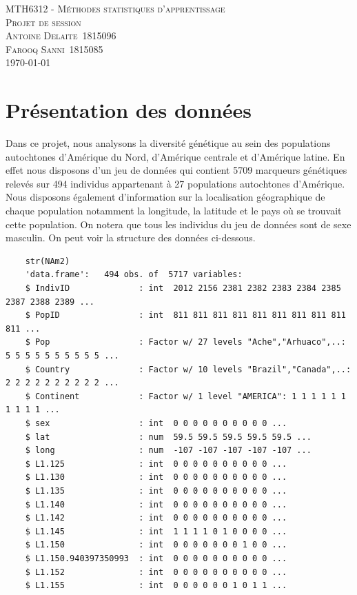 \documentclass[12pt,a4paper]{article}
\begin{document}
\begin{titlepage}
\begin{center}
\textsc{\large MTH6312 - M\'ethodes statistiques d'apprentissage}\\[0.5cm]
\vspace{2in}
\textsc{\LARGE Projet de session}\\[1.5cm]
\vspace{2in}
\textsc{\Large Antoine Delaite~1815096\\Farooq Sanni~1815085}\\[0.5cm]
\today %
\end{center}
\end{titlepage}
\section{Présentation des données}
\noindent Dans ce projet, nous analysons la diversité génétique au sein des
populations autochtones d'Amérique du Nord, d'Amérique centrale et d'Amérique
latine. En effet nous disposons d'un jeu de données qui contient 5709 marqueurs
génétiques relevés sur 494 individus appartenant à 27 populations autochtones
d'Amérique. Nous disposons également d'information sur la localisation
géographique de chaque population notamment la longitude, la latitude et le
pays où se trouvait cette population. On notera que tous les individus du jeu
de données sont de sexe masculin. On peut voir la structure des données
ci-dessous.\vspace{2mm}

\begin{lstlisting}
	str(NAm2)
	'data.frame':	494 obs. of  5717 variables:
	$ IndivID              : int  2012 2156 2381 2382 2383 2384 2385 2387 2388 2389 ...
	$ PopID                : int  811 811 811 811 811 811 811 811 811 811 ...
	$ Pop                  : Factor w/ 27 levels "Ache","Arhuaco",..: 5 5 5 5 5 5 5 5 5 5 ...
	$ Country              : Factor w/ 10 levels "Brazil","Canada",..: 2 2 2 2 2 2 2 2 2 2 ...
	$ Continent            : Factor w/ 1 level "AMERICA": 1 1 1 1 1 1 1 1 1 1 ...
	$ sex                  : int  0 0 0 0 0 0 0 0 0 0 ...
	$ lat                  : num  59.5 59.5 59.5 59.5 59.5 ...
	$ long                 : num  -107 -107 -107 -107 -107 ...
	$ L1.125               : int  0 0 0 0 0 0 0 0 0 0 ...
	$ L1.130               : int  0 0 0 0 0 0 0 0 0 0 ...
	$ L1.135               : int  0 0 0 0 0 0 0 0 0 0 ...
	$ L1.140               : int  0 0 0 0 0 0 0 0 0 0 ...
	$ L1.142               : int  0 0 0 0 0 0 0 0 0 0 ...
	$ L1.145               : int  1 1 1 1 0 1 0 0 0 0 ...
	$ L1.150               : int  0 0 0 0 0 0 0 1 0 0 ...
	$ L1.150.940397350993  : int  0 0 0 0 0 0 0 0 0 0 ...
	$ L1.152               : int  0 0 0 0 0 0 0 0 0 0 ...
	$ L1.155               : int  0 0 0 0 0 0 1 0 1 1 ...
\end{lstlisting}
\end{document}
